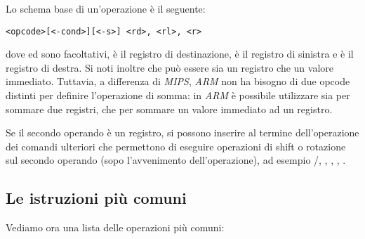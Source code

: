 \documentclass[class=book, crop=false, oneside]{standalone}
\begin{document}
Lo schema base di un'operazione è il seguente:
\begin{center}
	\texttt{<opcode>[<-cond>][<-s>] <rd>, <rl>, <r>}
\end{center}
dove  ed  sono facoltativi,  è il registro di destinazione,  è il registro di sinistra e  è il registro di destra. Si noti inoltre che  può essere sia un registro che un valore immediato. Tuttavia, a differenza di \emph{MIPS}, \emph{ARM} non ha bisogno di due opcode distinti per definire l'operazione di somma: in \emph{ARM} è possibile utilizzare  sia per sommare due registri, che per sommare un valore immediato ad un registro.

Se il secondo operando è un registro, si possono inserire al termine dell'operazione dei comandi ulteriori che permettono di eseguire operazioni di shift o rotazione sul secondo operando (sopo l'avvenimento dell'operazione), ad esempio /, , , , .

\subsection*{Le istruzioni più comuni}
Vediamo ora una lista delle operazioni più comuni:
\end{document}
